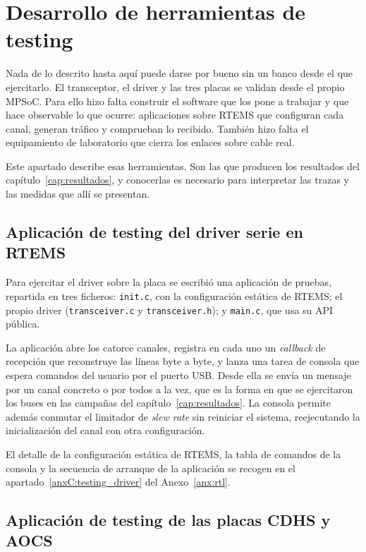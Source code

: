 \section{Desarrollo de herramientas de testing}

Nada de lo descrito hasta aquí puede darse por bueno sin un banco desde el que ejercitarlo. El
transceptor, el driver y las tres placas se validan desde el propio MPSoC. Para ello hizo falta
construir el software que los pone a trabajar y que hace observable lo que ocurre: aplicaciones
sobre RTEMS que configuran cada canal, generan tráfico y comprueban lo recibido. También hizo
falta el equipamiento de laboratorio que cierra los enlaces sobre cable real.

Este apartado describe esas herramientas. Son las que producen los resultados del
capítulo~\ref{cap:resultados}, y
conocerlas es necesario para interpretar las trazas y las medidas que allí se presentan.

\subsection{Aplicación de testing del driver serie en RTEMS} \label{sec:testing_driver}

Para ejercitar el driver sobre la placa se escribió una aplicación de pruebas, repartida en tres
ficheros: \texttt{init.c}, con la configuración estática de RTEMS; el propio driver
(\texttt{transceiver.c} y \texttt{transceiver.h}); y \texttt{main.c}, que usa su API pública.

La aplicación abre los catorce canales, registra en cada uno un \textit{callback} de recepción que
reconstruye las líneas byte a byte, y lanza una tarea de consola que espera comandos del usuario
por el puerto USB. Desde ella se envía un mensaje por un canal concreto o por todos a la vez, que
es la forma en que se ejercitaron los buses en las campañas del capítulo~\ref{cap:resultados}.
La consola permite además conmutar el limitador de \textit{slew rate} sin reiniciar el sistema,
reejecutando la inicialización del canal con otra configuración.

El detalle de la configuración estática de RTEMS, la tabla de comandos de la consola y la
secuencia de arranque de la aplicación se recogen en el apartado~\ref{anxC:testing_driver} del Anexo~\ref{anx:rtl}.

\subsection{Aplicación de testing de las placas CDHS y AOCS}

